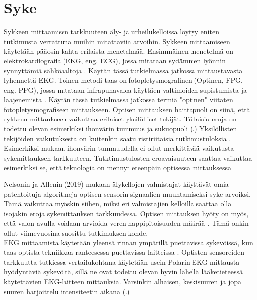 \documentclass[utf8,bachelor,finnish]{bachelor}
\begin{document}
  \section{Syke}
  Sykkeen mittaamisen tarkkuuteen äly- ja urheilukelloissa löytyy eniten tutkimusta verrattuna muihin mitattaviin arvoihin.
   Sykkeen mittaamiseen käytetään pääosin kahta erilaista menetelmää. Ensimmäinen menetelmä on elektrokardiografia (EKG, eng. ECG), jossa mitataan sydämmen lyönnin
   synnyttämiä sähköaaltoja \parencite{noauthor_heart_nodate}. Käytän tässä tutkielmassa jatkossa mittaustavasta lyhennettä EKG.
    Toinen metodi taas on fotopletysmografinen (Optinen, FPG, eng. PPG), jossa mitataan infrapunavaloa käyttäen valtimoiden supistumista ja laajenemista \parencite{noauthor_heart_nodate}.
      Käytän tässä tutkielmassa jatkossa termiä "optinen" viitaten fotopletysmografiseen
      mittaukseen. Optisen mittauksen haittapuoli on siinä, että sykkeen mittaukseen vaikuttaa erilaiset yksilölliset tekijät.
       Tällaisia eroja on todettu olevan esimerkiksi ihonvärin tummuus ja sukuopuoli (\cite{shcherbina_accuracy_2017,hochstadt_continuous_2020}.)
       Yksilöllisten tekijöiden vaikutuksesta on kuitenkin saatu ristiriitaisia tutkimustuloksia \parencite{pasadyn_accuracy_2019}.
        Esimerkiksi \cite{sanudo_pilot_2019, bent_investigating_2020} mukaan ihonvärin tummuudella ei ollut merkittävää vaikutusta sykemittauksen tarkkuuteen.
         Tutktimustulosten eroavaisuuteen saattaa vaikuttaa esimerkiksi se, että teknologia on mennyt eteenpäin optisessa mittauksessa \parencite{}
      
      
      Nelsonin ja Allenin (2019) mukaan älykellojen valmistajat käyttävät omia patentoituja algoritmeja optisen sensorin
       signaalien muuntamiseksi syke arvoiksi. Tämä vaikuttaa myöskin siihen, miksi eri valmistajien kelloilla saattaa olla isojakin eroja
        sykemittauksen tarkkuudessa. Optisen mittauksen hyöty on myös, että  valon avulla voidaan arvioida veren happipitoisuuden määrää \parencite{noauthor_heart_nodate}.
         Tämä onkin ollut viimevuosina suosittu tutkimuksen kohde.\\


      
  EKG mittaamista käytetään yleensä rinnan ympärillä puettavissa sykevöissä, kun taas optista tekniikkaa ranteesessa puettavissa laitteissa \parencite{noauthor_heart_nodate}.
   Optisten sensoreiden tarkkuutta tutkiessa vertailukohtana käytetään usein Polarin EKG-mittausta hyödyntäviä sykevöitä, sillä ne ovat todettu olevan hyvin lähellä
    lääketieteessä käytettävien EKG-laitteen mittauksia. Varsinkin alhaisen, keskisuuren ja jopa suuren harjoittelu intensiteetin aikana
     (\cite{gilgen-ammann_rr_2019, nelson_accuracy_2019}.) \\
\end{document}
